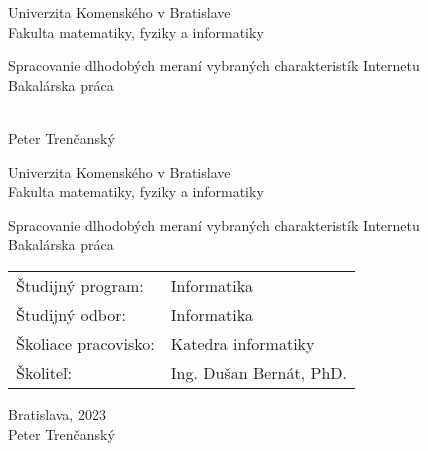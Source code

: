 \documentclass[12pt, twoside]{book}
\def\mfrok{2023}
\def\mfnazov{Spracovanie dlhodobých meraní vybraných charakteristík Internetu}
\def\mftyp{Bakalárska práca}
\def\mfautor{Peter Trenčanský}
\def\mfskolitel{Ing. Dušan Bernát, PhD. }
\def\mfkonzultant{tit. Meno Priezvisko, tit. }
\def\mfmiesto{Bratislava, \mfrok}
\def\mfodbor{ Informatika}
\def\program{ Informatika }
\def\mfpracovisko{ Katedra informatiky }
\begin{document}
     
\frontmatter
\pagestyle{empty}


\begin{center}
\sc\large
Univerzita Komenského v Bratislave\\
Fakulta matematiky, fyziky a informatiky

\vfill

{\LARGE\mfnazov}\\
\mftyp
\end{center}

\vfill

{\sc\large 
\noindent \mfrok\\
\mfautor
}

\cleardoublepage



\noindent

\begin{center}
\sc  
\large
Univerzita Komenského v Bratislave\\
Fakulta matematiky, fyziky a informatiky

\vfill

{\LARGE\mfnazov}\\
\mftyp
\end{center}

\vfill

\noindent
\begin{tabular}{ll}
Študijný program: & \program \\
Študijný odbor: & \mfodbor \\
Školiace pracovisko: & \mfpracovisko \\
Školiteľ: & \mfskolitel \\
\end{tabular}

\vfill


\noindent \mfmiesto\\
\mfautor

\cleardoublepage



\newpage 
\setcounter{page}{2}

\end{document}
